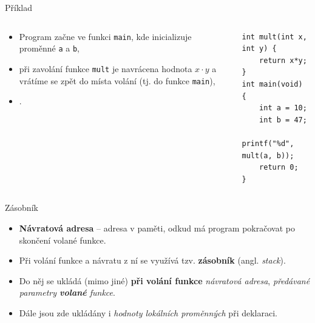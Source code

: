 \documentclass[14pt,aspectratio=169]{beamer}
\begin{document}
    \begin{frame}[t,fragile]{Příklad}
        \begin{columns}[onlytextwidth]
            \begin{column}{0.55\textwidth}
                \begin{itemize}
                    \item Program začne ve funkci \texttt{main}, kde inicializuje proměnné \texttt{a} a \texttt{b},
                    \item při zavolání funkce \texttt{mult} je navrácena hodnota $x\cdot y$ a vrátíme se zpět do místa volání (tj. do funkce \texttt{main}),
                    \item {} .
                \end{itemize}
            \end{column}
            
            \begin{column}{0.41\textwidth}
                \begin{lstlisting}
int mult(int x, int y) {
    return x*y;
}
int main(void) {
    int a = 10;
    int b = 47;
    printf("%d", mult(a, b));
    return 0;
}
                \end{lstlisting}
            \end{column}
        \end{columns}
        
    \end{frame}

    \begin{frame}[t]{Zásobník}
        \begin{itemize}
            \item \textbf{Návratová adresa} -- adresa v paměti, odkud má program pokračovat po skončení volané funkce.
            \item Při volání funkce a návratu z ní se využívá tzv. \textbf{zásobník} (angl. \emph{stack}).
            \item Do něj se ukládá (mimo jiné) \textbf{při volání funkce} \emph{návratová adresa}, \emph{předávané parametry \textbf{volané} funkce}.
            \item Dále jsou zde ukládány i \emph{hodnoty lokálních proměnných} při deklaraci.
        \end{itemize}
    \end{frame}
\end{document}
